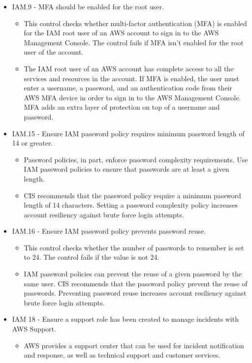 \begin{mdframed}[backgroundcolor=gray!05, linecolor=gray!50]
\begin{itemize}
\begin{itemize}
    \end{itemize}
    \item IAM.9 - MFA should be enabled for the root user.
    \begin{itemize}
        \item This control checks whether multi-factor authentication (MFA) is enabled for the IAM root user of an AWS account to sign in to the AWS Management Console. The control fails if MFA isn't enabled for the root user of the account.
        \item The IAM root user of an AWS account has complete access to all the services and resources in the account. If MFA is enabled, the user must enter a username, a password, and an authentication code from their AWS MFA device in order to sign in to the AWS Management Console. MFA adds an extra layer of protection on top of a username and password.
    \end{itemize}
    \item IAM.15 - Ensure IAM password policy requires minimum password length of 14 or greater.
    \begin{itemize}
        \item Password policies, in part, enforce password complexity requirements. Use IAM password policies to ensure that passwords are at least a given length.
        \item CIS recommends that the password policy require a minimum password length of 14 characters. Setting a password complexity policy increases account resiliency against brute force login attempts.
    \end{itemize}
    \item IAM.16 - Ensure IAM password policy prevents password reuse.
    \begin{itemize}
        \item This control checks whether the number of passwords to remember is set to 24. The control fails if the value is not 24.
        \item IAM password policies can prevent the reuse of a given password by the same user. CIS recommends that the password policy prevent the reuse of passwords. Preventing password reuse increases account resiliency against brute force login attempts.
    \end{itemize}
    \item IAM 18 - Ensure a support role has been created to manage incidents with AWS Support.
    \begin{itemize}
        \item AWS provides a support center that can be used for incident notification and response, as well as technical support and customer services.

\end{itemize}
\end{itemize}
\end{mdframed}
